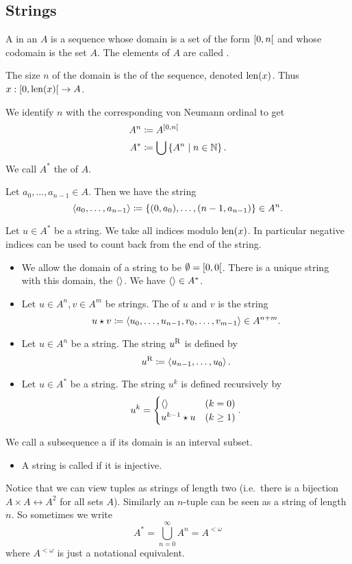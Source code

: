 \subsection{Strings}
\begin{definition}
A  in an  $A$ is a sequence whose domain is a set of the form $\interval[co]{0,n}$ and whose codomain is the set $A$. The elements of $A$ are called .

The size $n$ of the domain is the  of the sequence, denoted $\operatorname{len}(x)$. Thus $x: \interval[co]{0,\len(x)}\to A$.


We identify $n$ with the corresponding von Neumann ordinal to get
\begin{align*}
A^{n} &\defeq A^{\interval[co]{0,n}} \\
A^* &\defeq \bigcup\setbuilder{ A^{n}}{n\in \N}.
\end{align*}
We call $A^*$ the  of $A$.

Let $a_0,\ldots, a_{n-1}\in A$. Then we have the string
\[ \left\langle a_0,\ldots, a_{n-1} \right\rangle \coloneqq \{(0,a_0),\ldots, (n-1,a_{n-1})\} \in A^{n}. \]

Let $u\in A^*$ be a string. We take all indices modulo $\operatorname{len}(x)$. In particular negative indices can be used to count back from the end of the string.

\begin{itemize}
\item We allow the domain of a string to be $\emptyset = \interval[co]{0,0}$. There is a unique string with this domain, the  $\left\langle  \right\rangle$. We have $\left\langle  \right\rangle\in A^*$.
\item Let $u\in A^{n}, v\in A^{m}$ be strings. The  of $u$ and $v$ is the string
\[ u\star v \coloneqq \left\langle u_0,\ldots, u_{n-1},v_0,\ldots, v_{m-1} \right\rangle \in A^{n+m}. \]
\item Let $u\in A^{n}$ be a string. The  string ${u}^\mathrm{R}$ is defined by
\[ {u}^\mathrm{R} \coloneqq \left\langle u_{n-1}, \ldots, u_0 \right\rangle. \]
\item Let $u\in A^*$ be a string. The string $u^k$ is defined recursively by
\[ u^{k} = \begin{cases}
\left\langle  \right\rangle & (k=0) \\
u^{k-1}\star u & (k\geq 1)
\end{cases}. \]
\end{itemize}
We call a subsequence a  if its domain is an interval subset.
\begin{itemize}
\item A string is called  if it is injective.
\end{itemize}
\end{definition}
Notice that we can view tuples as strings of length two (i.e.\ there is a bijection $A\times A \leftrightarrow A^{2}$ for all sets $A$). Similarly an $n$-tuple can be seen as a string of length $n$. So sometimes we write
\[ A^* = \bigcup^\infty_{n=0}A^n = A^{<\omega}\]
where $A^{<\omega}$ is just a notational equivalent.

